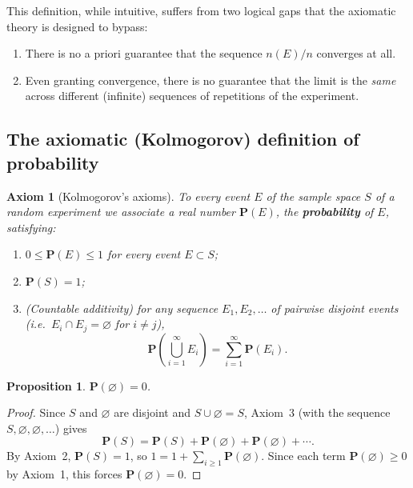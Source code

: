\documentclass[11pt]{article}
\theoremstyle{definition}
\theoremstyle{plain}
\newtheorem{proposition}[definition]{Proposition}
\newtheorem{axiom}[definition]{Axiom}
\theoremstyle{remark}
\begin{document}
This definition, while intuitive, suffers from two logical gaps that the axiomatic theory is
designed to bypass:
\begin{enumerate}
\item There is no a priori guarantee that the sequence $n(E)/n$ converges at all.
\item Even granting convergence, there is no guarantee that the limit is the \emph{same} across
different (infinite) sequences of repetitions of the experiment.
\end{enumerate}

\subsection{The axiomatic (Kolmogorov) definition of probability}

\begin{axiom}[Kolmogorov's axioms]
\label{ax:kolmogorov}
To every event $E$ of the sample space $S$ of a random experiment we associate a real number
$\mathbf{P}(E)$, the \textbf{probability} of $E$, satisfying:
\begin{enumerate}[label=(\arabic*)]
\item $0 \le \mathbf{P}(E) \le 1$ for every event $E \subset S$;
\item $\mathbf{P}(S) = 1$;
\item (Countable additivity) for any sequence $E_1, E_2, \dots$ of pairwise disjoint events (i.e.\
$E_i \cap E_j = \varnothing$ for $i \ne j$),
\[
\mathbf{P}\left(\bigcup_{i=1}^\infty E_i\right) = \sum_{i=1}^\infty \mathbf{P}(E_i).
\]
\end{enumerate}
\end{axiom}

\begin{proposition}
$\mathbf{P}(\varnothing) = 0$.
\end{proposition}
\begin{proof}
Since $S$ and $\varnothing$ are disjoint and $S \cup \varnothing = S$, Axiom~3 (with the sequence
$S, \varnothing, \varnothing, \dots$) gives
\[
\mathbf{P}(S) = \mathbf{P}(S) + \mathbf{P}(\varnothing) + \mathbf{P}(\varnothing) + \cdots.
\]
By Axiom~2, $\mathbf{P}(S)=1$, so $1 = 1 + \sum_{i\ge 1}\mathbf{P}(\varnothing)$. Since each term
$\mathbf{P}(\varnothing) \ge 0$ by Axiom~1, this forces $\mathbf{P}(\varnothing) = 0$.
\end{proof}
\end{document}
